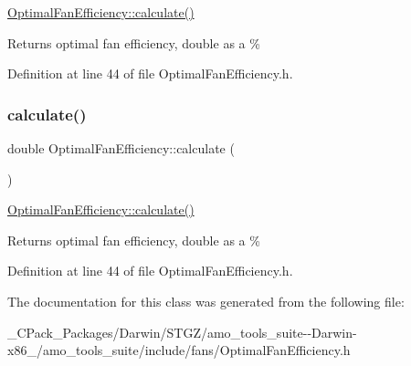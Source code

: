 \hyperlink{class_optimal_fan_efficiency_ac35291d1095c74373393ac510e45ae02}{Optimal\+Fan\+Efficiency\+::calculate()} \begin{DoxyReturn}{Returns}
optimal fan efficiency, double as a \% 
\end{DoxyReturn}


Definition at line 44 of file Optimal\+Fan\+Efficiency.\+h.

\mbox{\label{class_optimal_fan_efficiency_ac35291d1095c74373393ac510e45ae02}} 
\subsubsection{\texorpdfstring{calculate()}{calculate()}\hspace{0.1cm}{\footnotesize\ttfamily [3/3]}}
{\footnotesize\ttfamily double Optimal\+Fan\+Efficiency\+::calculate (\begin{DoxyParamCaption}{ }\end{DoxyParamCaption})\hspace{0.3cm}{\ttfamily [inline]}}

\hyperlink{class_optimal_fan_efficiency_ac35291d1095c74373393ac510e45ae02}{Optimal\+Fan\+Efficiency\+::calculate()} \begin{DoxyReturn}{Returns}
optimal fan efficiency, double as a \% 
\end{DoxyReturn}


Definition at line 44 of file Optimal\+Fan\+Efficiency.\+h.



The documentation for this class was generated from the following file\+:\begin{DoxyCompactItemize}
\item 
\+\_\+\+C\+Pack\+\_\+\+Packages/\+Darwin/\+S\+T\+G\+Z/amo\+\_\+tools\+\_\+suite-\/-\/\+Darwin-\/x86\+\_/amo\+\_\+tools\+\_\+suite/include/fans/Optimal\+Fan\+Efficiency.\+h\end{DoxyCompactItemize}
